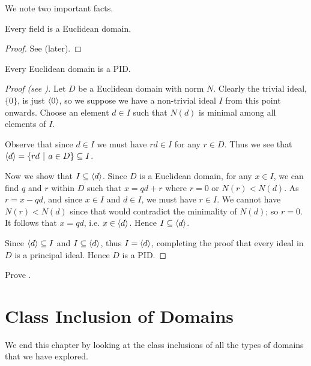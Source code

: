 We note two important facts.

\begin{theorem}\label{thrm-field-is-euclidean-domain}
    Every field is a Euclidean domain.
\end{theorem}
\begin{proof}
    See  (later).
\end{proof}

\newpage

\begin{theorem}\label{thrm-euclidean-domain-is-PID}
    Every Euclidean domain is a PID.
\end{theorem}
\begin{proof}[Proof (see {\cite[Theorem 18.4]{gallian_2016}})]
    Let $D$ be a Euclidean domain with norm $N$. Clearly the trivial ideal, $\{0\}$, is just $\left\langle0\right\rangle$, so we suppose we have a non-trivial ideal $I$ from this point onwards. Choose an element $d \in I$ such that $N(d)$ is minimal among all elements of $I$.

    Observe that since $d \in I$ we must have $rd \in I$ for any $r \in D$. Thus we see that $\princ{d} = \left\{rd \vert a \in D\right\} \subseteq I$.
    
    Now we show that $I \subseteq \left\langle d\right\rangle$. Since $D$ is a Euclidean domain, for any $x \in I$, we can find $q$ and $r$ within $D$ such that $x = qd + r$ where $r = 0$ or $N(r) < N(d)$. As $r = x - qd$, and since $x \in I$ and $d \in I$, we must have $r \in I$. We cannot have $N(r) < N(d)$ since that would contradict the minimality of $N(d)$; so $r = 0$. It follows that $x = qd$, i.e. $x \in \left\langle d\right\rangle$. Hence $I \subseteq \left\langle d\right\rangle$.

    Since $\left\langle d\right\rangle \subseteq I$ and $I \subseteq \left\langle d\right\rangle$, thus $I = \left\langle d\right\rangle$, completing the proof that every ideal in $D$ is a principal ideal. Hence $D$ is a PID.
\end{proof}

\begin{exercise}\label{exercise-field-is-euclidean-domain}
    Prove .
\end{exercise}

\section{Class Inclusion of Domains}
We end this chapter by looking at the class inclusions of all the types of domains that we have explored.

